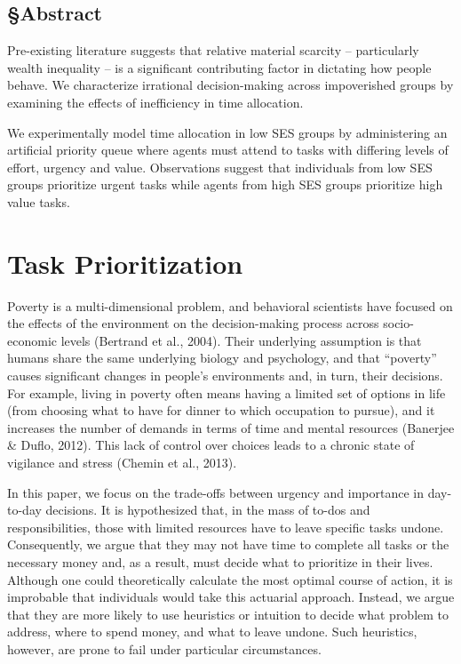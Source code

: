 \hypertarget{abstract}{%
\subsection{§Abstract}\label{abstract}}

Pre-existing literature suggests that relative material scarcity --
particularly wealth inequality -- is a significant contributing factor
in dictating how people behave. We characterize irrational
decision-making across impoverished groups by examining the effects of
inefficiency in time allocation.

We experimentally model time allocation in low SES groups by
administering an artificial priority queue where agents must attend to
tasks with differing levels of effort, urgency and value. Observations
suggest that individuals from low SES groups prioritize urgent tasks
while agents from high SES groups prioritize high value tasks.

\hypertarget{task-prioritization}{%
\section{Task Prioritization}\label{task-prioritization}}

Poverty is a multi-dimensional problem, and behavioral scientists have
focused on the effects of the environment on the decision-making process
across socio-economic levels (Bertrand et al., 2004). Their underlying
assumption is that humans share the same underlying biology and
psychology, and that ``poverty'' causes significant changes in people's
environments and, in turn, their decisions. For example, living in
poverty often means having a limited set of options in life (from
choosing what to have for dinner to which occupation to pursue), and it
increases the number of demands in terms of time and mental resources
(Banerjee \& Duflo, 2012). This lack of control over choices leads to a
chronic state of vigilance and stress (Chemin et al., 2013).

In this paper, we focus on the trade-offs between urgency and importance
in day-to-day decisions. It is hypothesized that, in the mass of to-dos
and responsibilities, those with limited resources have to leave
specific tasks undone. Consequently, we argue that they may not have
time to complete all tasks or the necessary money and, as a result, must
decide what to prioritize in their lives. Although one could
theoretically calculate the most optimal course of action, it is
improbable that individuals would take this actuarial approach. Instead,
we argue that they are more likely to use heuristics or intuition to
decide what problem to address, where to spend money, and what to leave
undone. Such heuristics, however, are prone to fail under particular
circumstances.

